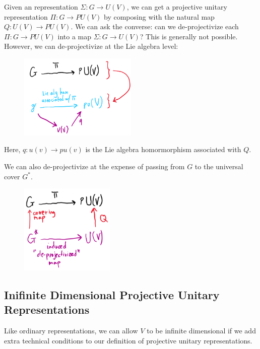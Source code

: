 Given an representation $\Sigma: G \rightarrow U(V)$, we can get a projective unitary representation $\Pi: G \rightarrow PU(V)$ by composing with the natural map $Q: U(V) \rightarrow PU(V)$. We can ask the converse: can we de-projectivize each $\Pi: G \rightarrow PU(V)$ into a map $\Sigma: G \rightarrow U(V)$? This is generally not possible. However, we can de-projectivize at the Lie algebra level:
\begin{figure}[H]
    \includegraphics[width=0.5\textwidth]{figures/de-projectivization}
    \centering
\end{figure}

Here, $q: u(v) \rightarrow pu(v)$ is the Lie algebra homormorphism associated with $Q$.

We can also de-projectivize at the expense of passing from $G$ to the universal cover $G^*$.
\begin{figure}[H]
    \includegraphics[width=0.4\textwidth]{figures/de-projectivization2}
    \centering
\end{figure}

\subsection{Inifinite Dimensional Projective Unitary Representations}
Like ordinary representations, we can allow $V$ to be infinite dimensional if we add extra technical conditions to our definition of projective unitary representations.

